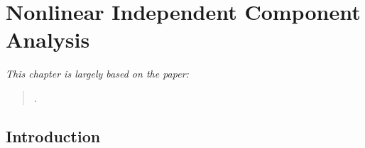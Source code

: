 
\newcommand\independent{\protect\mathpalette{\protect\independenT}{\perp}}
\def\independenT#1#2{\mathrel{\rlap{$#1#2$}\mkern2mu{#1#2}}}


\chapter{Nonlinear Independent Component Analysis}\label{chapter:ica}

\ifpdf
    \graphicspath{{Chapter4/Figs/Raster/}{Chapter4/Figs/PDF/}{Chapter4/Figs/}}
\else
    \graphicspath{{Chapter4/Figs/Vector/}{Chapter4/Figs/}}
\fi

\emph{This chapter is largely based on the paper:}

\begin{quote}
	.
\end{quote}



\section{Introduction}


